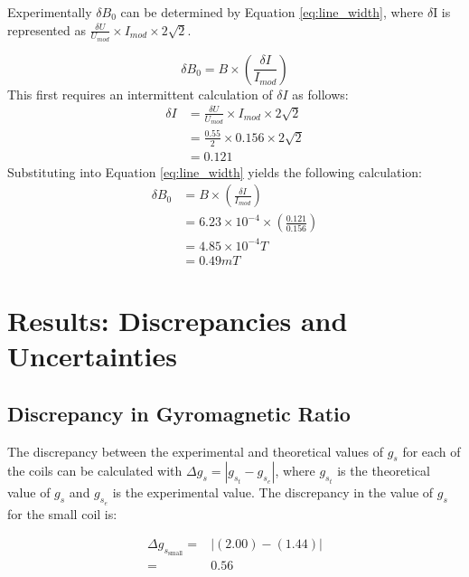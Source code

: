 \documentclass[a4paper]{article}
\begin{document}
\newpage

Experimentally $\delta B_0$ can be determined by Equation \ref{eq:line_width}, where $\delta$I is represented as $\frac{\delta U}{U_{mod}} \times  I_{mod} \times 2\sqrt{2}$.

\begin{equation}
\label{eq:line_width}
\delta B_0 = B \times \left( \frac{\delta I}{I_{mod}} \right)
\end{equation}
%
This first requires an intermittent calculation of $\delta I$ as follows:
%
\begin{align*}
\delta I &= \frac{\delta U}{U_{mod}} \times  I_{mod} \times 2\sqrt{2} \\
         &= \frac{0.55}{2} \times 0.156 \times 2\sqrt{2} \\
         &= 0.121
\end{align*}
%
Substituting into Equation \ref{eq:line_width} yields the following calculation:
%
\begin{align*}
\delta B_0 &= B \times \left( \frac {\delta I} {I_{mod}} \right) \\
           &= 6.23 \times 10^{-4} \times \left( \frac {0.121} {0.156} \right) \\
           &= 4.85 \times 10^{-4} T \\
           &= 0.49 mT
\end{align*}


\section{Results: Discrepancies and Uncertainties}

\subsection{Discrepancy in Gyromagnetic Ratio}
\qq The discrepancy between the experimental and theoretical values of \( g_s \)
for each of the coils can be calculated with
\( \Delta g_s = | g_{s_t} - g_{s_e} | \), where \( g_{s_t} \) is the theoretical
value of \( g_s \) and \( g_{s_e} \) is the experimental value. The discrepancy
in the value of \( g_s \) for the small coil is:

\begin{align*}
  \Delta g_{s_{\text{small}}} =& \left| (2.00) - (1.44) \right| \\
   =& 0.56 \\
\end{align*}
\end{document}
